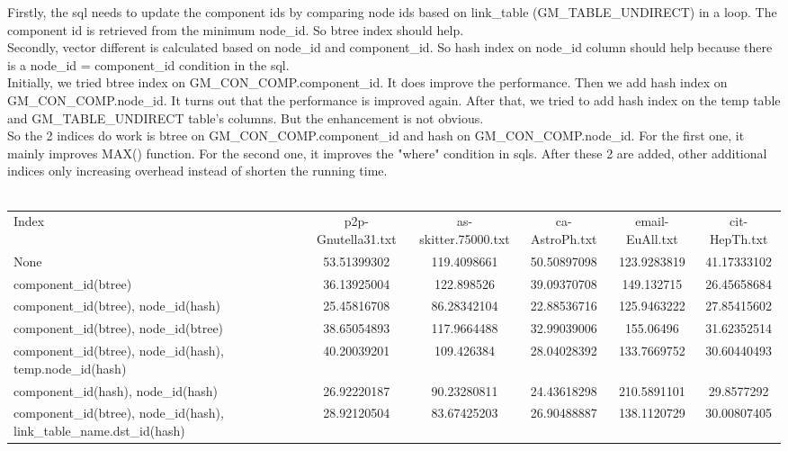\documentclass[]{article}
\begin{document}
Firstly, the sql needs to update the component ids by comparing node ids based on link\_table (GM\_TABLE\_UNDIRECT) in a loop. The component id is retrieved from the minimum node\_id. So btree index should help. \\
Secondly, vector different is calculated based on node\_id and component\_id. So hash index on node\_id column should help because there is a node\_id = component\_id condition in the sql. \\
Initially, we tried btree index on GM\_CON\_COMP.component\_id. It does improve the performance. Then we add hash index on GM\_CON\_COMP.node\_id. It turns out that the performance is improved again. After that, we tried to add hash index on the temp table and GM\_TABLE\_UNDIRECT table's columns. But the enhancement is not obvious. \\
So the 2 indices do work is btree on GM\_CON\_COMP.component\_id and hash on GM\_CON\_COMP.node\_id. For the first one, it mainly improves MAX() function. For the second one, it improves the "where" condition in sqls. After these 2 are added, other additional indices only increasing overhead instead of shorten the running time. \\
\\
\begin{tabular}{ p{3.5cm} c c c c c }
Index & p2p-Gnutella31.txt & as-skitter.75000.txt  & ca-AstroPh.txt & email-EuAll.txt & cit-HepTh.txt \\
None & 53.51399302 & 119.4098661 & 50.50897098 & 123.9283819 & 41.17333102 \\
component\_id(btree) & 36.13925004 & 122.898526 & 39.09370708 & 149.132715 & 26.45658684 \\
component\_id(btree), node\_id(hash) & 25.45816708 & 86.28342104 & 22.88536716 & 125.9463222 & 27.85415602 \\
component\_id(btree), node\_id(btree) & 38.65054893 & 117.9664488 & 32.99039006 & 155.06496 & 31.62352514 \\
component\_id(btree), node\_id(hash), temp.node\_id(hash) & 40.20039201 & 109.426384 & 28.04028392 & 133.7669752 & 30.60440493 \\
component\_id(hash), node\_id(hash) & 26.92220187 & 90.23280811 & 24.43618298 & 210.5891101 & 29.8577292 \\
component\_id(btree), node\_id(hash), link\_table\_name.dst\_id(hash)  & 28.92120504 & 83.67425203 & 26.90488887 & 138.1120729 & 30.00807405 \\
\end{tabular} \\
\end{document}
